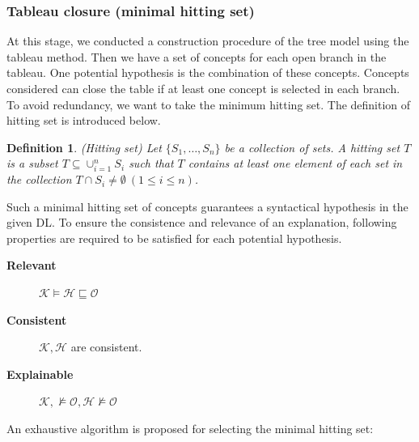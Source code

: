 \documentclass{article}
\newtheorem{mydef}{Definition}
\begin{document}
\subsubsection{Tableau closure (minimal hitting set)}
At this stage, we conducted a construction procedure of the tree model using  the tableau method. Then we have a set of concepts for each open branch in the tableau.
One potential hypothesis is the combination of these concepts. Concepts considered can close the table if at least one concept is selected in each branch.
To avoid redundancy, we want to take the minimum hitting set. The definition of hitting set is introduced below.
% 
\begin{mydef}{(Hitting set)}
 Let $\{ S_1,\dots,S_n\}$ be a collection of sets. A hitting set  $T$ is a subset $T\subseteq \cup_{i=1}^{n} S_i$ such that $T$ contains at least one element
 of each set in the collection $T \cap S_i \neq \emptyset~(1\leq i\leq n)$.
\end{mydef}

Such a minimal hitting set of concepts guarantees a syntactical hypothesis in the given DL. 
To ensure the consistence and relevance of an explanation, following properties are required to be satisfied for each potential hypothesis.
\begin{description}
 \item[\textbf{Relevant}] $\mathcal{K}\vDash \mathcal{H} \sqsubseteq \mathcal{O}$
 \item[\textbf{Consistent}] $\mathcal{K},\mathcal{H} $ are consistent.
 \item[\textbf{Explainable}] $\mathcal{K},\nvDash \mathcal{O}, \mathcal{H}   \nvDash \mathcal{O}$
\end{description}
\medskip

An exhaustive algorithm is proposed for selecting the minimal hitting set:
\end{document}
